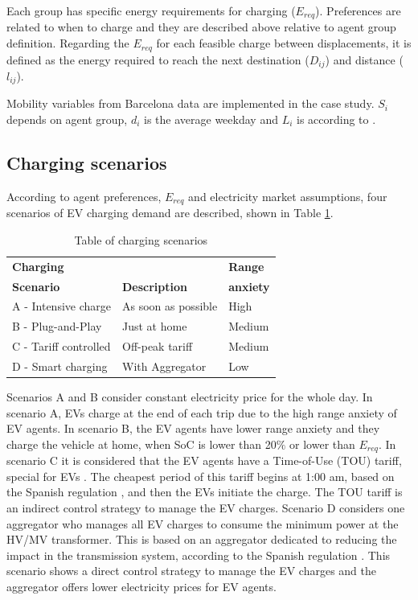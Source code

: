 \documentclass[a4paper,11pt,twoside,openright]{report}
\begin{document}
Each group has specific energy requirements for charging ($E_{req}$). Preferences are related to when to charge and they are described above relative to agent group definition. Regarding the $E_{req}$ for each feasible charge between displacements, it is defined as the energy required to reach the next destination ($D_{ij}$) and distance ($l_{ij}$).

Mobility variables from Barcelona data \cite{EMQ2006} are implemented in the case study. $S_{i}$ depends on agent group, $d_{i}$ is the average weekday and $L_{i}$ is according to \cite{Cetelem_Distancia}.

\subsection{Charging scenarios}

According to agent preferences, $E_{req}$ and electricity market assumptions, four scenarios of EV charging demand are described, shown in Table \ref{tab:scen}.
\begin{table} [htbp]
	\centering
	\caption{Table of charging scenarios} \label{tab:scen}
	\begin{tabular}{lll}
		
		{\bf Charging} &  & {\bf Range} \\
		
		{\bf Scenario}& {\bf Description}      & {\bf anxiety} \\
		\hline
		A - Intensive charge & As soon as possible &       High \\
		
		B - Plug-and-Play & Just at home &        Medium \\
		
		C - Tariff controlled & Off-peak tariff &        Medium \\
		
		D - Smart charging & With Aggregator &        Low \\
		\hline
	\end{tabular}  
\end{table}

Scenarios A and B consider constant electricity price for the whole day. In scenario A, EVs charge at the end of each trip due to the high range anxiety of EV agents. In scenario B, the EV agents have lower range anxiety and they charge the vehicle at home, when SoC is lower than 20$\%$ or lower than $E_{req}$. In scenario C it is considered that the EV agents have a Time-of-Use (TOU) tariff, special for EVs \cite{kostkova2013introduction}. The cheapest period of this tariff begins at 1:00 am, based on the Spanish regulation \cite{RD_GestorCargas}, and then the EVs initiate the charge. The TOU tariff is an indirect control strategy to manage the EV charges. Scenario D considers one aggregator who manages all EV charges to consume the minimum power at the HV/MV transformer. This is based on an aggregator dedicated to reducing the impact in the transmission system, according to the Spanish regulation \cite{RD_GestorCargas}. This scenario shows a direct control strategy to manage the EV charges and the aggregator offers lower electricity prices for EV agents.
\end{document}
